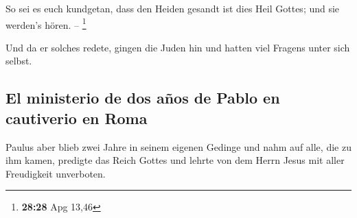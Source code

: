  So sei es euch kundgetan, dass den Heiden gesandt ist
dies Heil Gottes; und sie werden's hören. -- \footnote{\textbf{28:28}
  Apg 13,46}

 Und da er solches redete, gingen die Juden hin und
hatten viel Fragens unter sich selbst.

\hypertarget{el-ministerio-de-dos-auxf1os-de-pablo-en-cautiverio-en-roma}{%
\subsection{El ministerio de dos años de Pablo en cautiverio en
Roma}\label{el-ministerio-de-dos-auxf1os-de-pablo-en-cautiverio-en-roma}}

 Paulus aber blieb zwei Jahre in seinem eigenen Gedinge
und nahm auf alle, die zu ihm kamen,  predigte das Reich
Gottes und lehrte von dem Herrn Jesus mit aller Freudigkeit unverboten.
